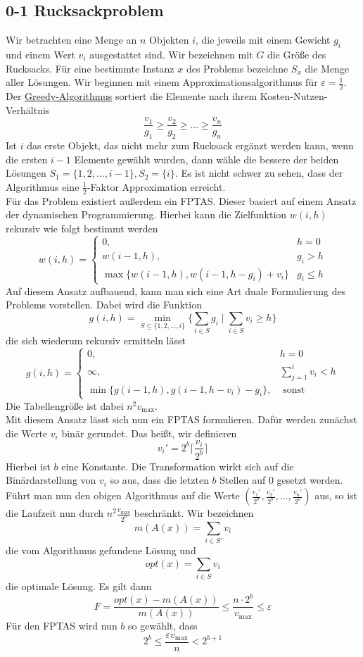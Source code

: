 \documentclass[a4paper, 12pt]{article}
\theoremstyle{plain}
\theoremstyle{definition}
\theoremstyle{lemma}
\theoremstyle{remark}
\theoremstyle{corollary}
\theoremstyle{example}
\begin{document}
	\subsection{0-1 Rucksackproblem}
	Wir betrachten eine Menge an $n$ Objekten $i$, die jeweils mit einem Gewicht $g_i$ und einem Wert $v_i$ ausgestattet sind. Wir bezeichnen mit $G$ die Größe des Rucksacks. Für eine bestimmte Instanz $x$ des Problems bezeichne $S_x$ die Menge aller Lösungen. Wir beginnen mit einem Approximationsalgorithmus für $\varepsilon = \frac{1}{2}$.\\
	Der \underline{Greedy-Algorithmus} sortiert die Elemente nach ihrem Kosten-Nutzen-Verhältnis \[\frac{v_1}{g_1} \geq \frac{v_2}{g_2} \geq \dots \geq \frac{v_n}{g_n}\] Ist $i$ das erste Objekt, das nicht mehr zum Rucksack ergänzt werden kann, wenn die ersten $i-1$ Elemente gewählt wurden, dann wähle die bessere der beiden Lösungen $S_1=\{1,2,\dots,i-1\}, S_2 = \{i\}$. Es ist nicht schwer zu sehen, dass der Algorithmus eine $\frac{1}{2}$-Faktor Approximation erreicht.\\
	Für das Problem existiert außerdem ein FPTAS. Dieser basiert auf einem Ansatz der dynamischen Programmierung. Hierbei kann die Zielfunktion $w(i,h)$ rekursiv wie folgt bestimmt werden \[w(i,h) = \begin{cases}
		0, & h=0\\
		w(i-1,h), & g_i > h\\
		\max\{w(i-1,h), w(i-1, h-g_i)+v_i\} & g_i \leq h
	\end{cases}\]
	Auf diesem Ansatz aufbauend, kann man sich eine Art duale Formulierung des Problems vorstellen. Dabei wird die Funktion \[g(i,h) = \min_{S\subseteq \{1,2,...,i\}} \{\sum_{i \in S} g_i \mid \sum_{i \in S} v_i \geq h\}\]
	die sich wiederum rekursiv ermitteln lässt \[g(i,h) = \begin{cases}
		0, & h=0\\
		\infty, & \sum_{j=1}^{i} v_i < h\\
		\min\{g(i-1,h), g(i-1, h-v_i) - g_i\}, & \text{ sonst}
	\end{cases}\]
	Die Tabellengröße ist dabei $n^2v_{\max}$.\\
	Mit diesem Ansatz lässt sich nun ein FPTAS formulieren. Dafür werden zunächst die Werte $v_i$ binär gerundet. Das heißt, wir definieren \[v_i' = 2^b \lceil\frac{v_i}{2^b}\rceil\] Hierbei ist $b$ eine Konstante. Die Transformation wirkt sich auf die Binärdarstellung von $v_i$ so aus, dass die letzten $b$ Stellen auf 0 gesetzt werden. Führt man nun den obigen Algorithmus auf die Werte $(\frac{v_1'}{2^b},\frac{v_2'}{2^b},...,\frac{v_n'}{2^b})$ aus, so ist die Laufzeit nun durch $n^2\frac{v_{\max}}{2^b}$ beschränkt. Wir bezeichnen \[m(A(x)) = \sum_{i \in S'} v_i\] die vom Algorithmus gefundene Lösung und \[opt(x) = \sum_{i \in S} v_i\] die optimale Lösung. Es gilt dann \[F = \frac{opt(x) - m(A(x))}{m(A(x))} \leq \frac{n\cdot 2^b}{v_{\max}} \leq \varepsilon\] Für den FPTAS wird nun $b$ so gewählt, dass \[2^b \leq \frac{\varepsilon v_{\max}}{n} < 2^{b+1}\]
\end{document}
